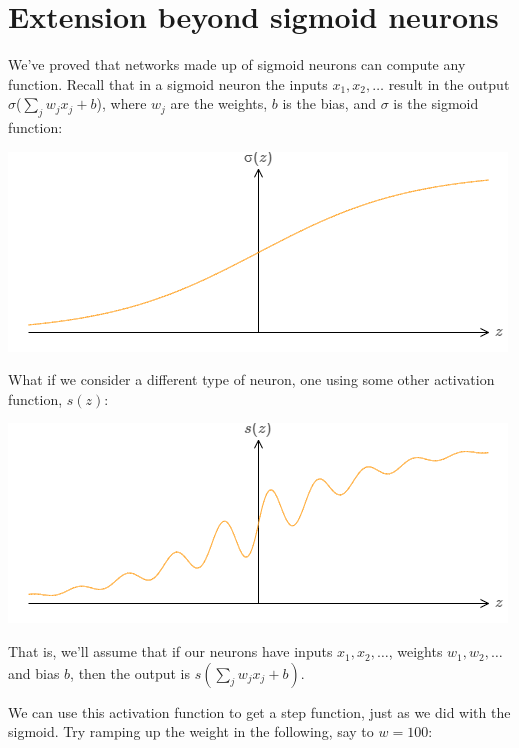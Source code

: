 \documentclass[a4paper,twoside,10pt]{book}
\begin{document}
\section{Extension beyond sigmoid neurons}
We've proved that networks made up of sigmoid neurons can compute any function. Recall that in a sigmoid neuron the inputs $x_1,x_2,\ldots$ result in the output $\sigma$($\sum_jw_jx_j+b$), where $w_j$ are the weights, $b$ is the bias, and $\sigma$ is the sigmoid function:
\begin{center}
	\includegraphics[width=0.7\linewidth]{figures/ch4/tikz451}
\end{center}
What if we consider a different type of neuron, one using some other activation function, $s(z)$:
\begin{center}
	\includegraphics[width=0.7\linewidth]{figures/ch4/tikz452}
\end{center}
That is, we'll assume that if our neurons have inputs $x_1,x_2,\ldots$, weights $w_1,w_2,\ldots$ and bias $b$, then the output is $s(\sum_jw_jx_j+b)$.

We can use this activation function to get a step function, just as we did with the sigmoid. Try ramping up the weight in the following, say to $w=100$:
\end{document}
